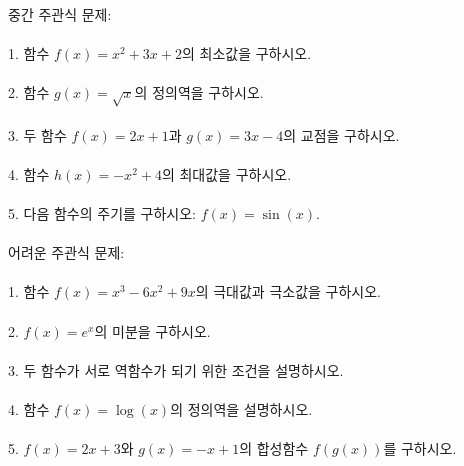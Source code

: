 \documentclass[fleqn]{article}
\begin{document}
중간 주관식 문제: \\\\  
1. 함수 $f(x) = x^2 + 3x + 2$의 최소값을 구하시오. \\\\  
2. 함수 $g(x) = \sqrt{x}$의 정의역을 구하시오. \\\\  
3. 두 함수 $f(x) = 2x + 1$과 $g(x) = 3x - 4$의 교점을 구하시오. \\\\  
4. 함수 $h(x) = -x^2 + 4$의 최대값을 구하시오. \\\\  
5. 다음 함수의 주기를 구하시오: $f(x) = \sin(x)$. \\\\  

어려운 주관식 문제: \\\\  
1. 함수 $f(x) = x^3 - 6x^2 + 9x$의 극대값과 극소값을 구하시오. \\\\  
2. $f(x) = e^x$의 미분을 구하시오. \\\\  
3. 두 함수가 서로 역함수가 되기 위한 조건을 설명하시오. \\\\  
4. 함수 $f(x) = \log(x)$의 정의역을 설명하시오. \\\\  
5. $f(x) = 2x + 3$와 $g(x) = -x + 1$의 합성함수 $f(g(x))$를 구하시오. \\\\  

      
      
\end{document}
